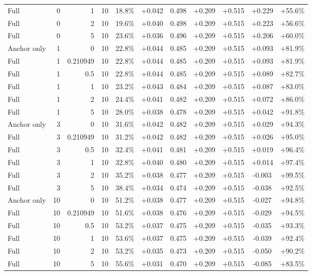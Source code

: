 \begin{table}[htbp]
\begin{tabular}{lrrrccccccc}
Full & 0 & 1 & 10 & 18.8\% & +0.042 & 0.498 & +0.209 & +0.515 & +0.229 & +55.6\% \\
Full & 0 & 2 & 10 & 19.6\% & +0.040 & 0.498 & +0.209 & +0.515 & +0.223 & +56.6\% \\
Full & 0 & 5 & 10 & 23.6\% & +0.036 & 0.496 & +0.209 & +0.515 & +0.206 & +60.0\% \\
Anchor only & 1 & 0 & 10 & 22.8\% & +0.044 & 0.485 & +0.209 & +0.515 & +0.093 & +81.9\% \\
Full & 1 & 0.210949 & 10 & 22.8\% & +0.044 & 0.485 & +0.209 & +0.515 & +0.093 & +81.9\% \\
Full & 1 & 0.5 & 10 & 22.8\% & +0.044 & 0.485 & +0.209 & +0.515 & +0.089 & +82.7\% \\
Full & 1 & 1 & 10 & 23.2\% & +0.043 & 0.484 & +0.209 & +0.515 & +0.087 & +83.0\% \\
Full & 1 & 2 & 10 & 24.4\% & +0.041 & 0.482 & +0.209 & +0.515 & +0.072 & +86.0\% \\
Full & 1 & 5 & 10 & 28.0\% & +0.038 & 0.478 & +0.209 & +0.515 & +0.042 & +91.8\% \\
Anchor only & 3 & 0 & 10 & 31.6\% & +0.042 & 0.482 & +0.209 & +0.515 & +0.029 & +94.3\% \\
Full & 3 & 0.210949 & 10 & 31.2\% & +0.042 & 0.482 & +0.209 & +0.515 & +0.026 & +95.0\% \\
Full & 3 & 0.5 & 10 & 32.4\% & +0.041 & 0.481 & +0.209 & +0.515 & +0.019 & +96.4\% \\
Full & 3 & 1 & 10 & 32.8\% & +0.040 & 0.480 & +0.209 & +0.515 & +0.014 & +97.4\% \\
Full & 3 & 2 & 10 & 35.2\% & +0.038 & 0.477 & +0.209 & +0.515 & -0.003 & +99.5\% \\
Full & 3 & 5 & 10 & 38.4\% & +0.034 & 0.474 & +0.209 & +0.515 & -0.038 & +92.5\% \\
Anchor only & 10 & 0 & 10 & 51.2\% & +0.038 & 0.477 & +0.209 & +0.515 & -0.027 & +94.8\% \\
Full & 10 & 0.210949 & 10 & 51.6\% & +0.038 & 0.476 & +0.209 & +0.515 & -0.029 & +94.5\% \\
Full & 10 & 0.5 & 10 & 53.2\% & +0.037 & 0.475 & +0.209 & +0.515 & -0.035 & +93.3\% \\
Full & 10 & 1 & 10 & 53.6\% & +0.037 & 0.475 & +0.209 & +0.515 & -0.039 & +92.4\% \\
Full & 10 & 2 & 10 & 53.2\% & +0.035 & 0.473 & +0.209 & +0.515 & -0.050 & +90.2\% \\
Full & 10 & 5 & 10 & 55.6\% & +0.031 & 0.470 & +0.209 & +0.515 & -0.085 & +83.5\% \\

\end{tabular}
\end{table}
